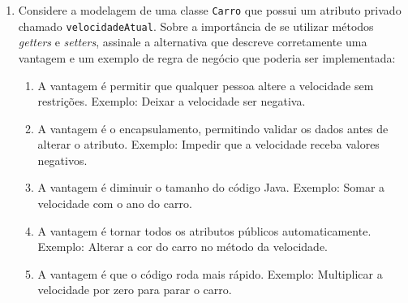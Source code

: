 \documentclass[12pt,a4paper]{article}
\begin{document}
\begin{enumerate}
\begin{lstlisting}
package conceicao; 
public class Conceicao {       
    protected String v; 
}
\end{lstlisting}

    \begin{enumerate}[label=\Alph*)]
        \item Apenas as classes que estejam no mesmo pacote.
        \item Apenas os métodos da própria classe.
        \item As classes filhas de qualquer pacote.
        \item As classes filhas apenas do mesmo pacote.
        \item Por qualquer classe de qualquer pacote.
    \end{enumerate}

    \item Considere a modelagem de uma classe \texttt{Carro} que possui um atributo privado chamado \texttt{velocidadeAtual}. Sobre a importância de se utilizar métodos \textit{getters} e \textit{setters}, assinale a alternativa que descreve corretamente uma vantagem e um exemplo de regra de negócio que poderia ser implementada:

    \begin{center}
    \end{center}

    \begin{enumerate}[label=\Alph*)]
        \item A vantagem é permitir que qualquer pessoa altere a velocidade sem restrições. Exemplo: Deixar a velocidade ser negativa.
        \item A vantagem é o encapsulamento, permitindo validar os dados antes de alterar o atributo. Exemplo: Impedir que a velocidade receba valores negativos.
        \item A vantagem é diminuir o tamanho do código Java. Exemplo: Somar a velocidade com o ano do carro.
        \item A vantagem é tornar todos os atributos públicos automaticamente. Exemplo: Alterar a cor do carro no método da velocidade.
        \item A vantagem é que o código roda mais rápido. Exemplo: Multiplicar a velocidade por zero para parar o carro.
    \end{enumerate}

\end{enumerate}
\vspace{0.8cm}
\end{document}
